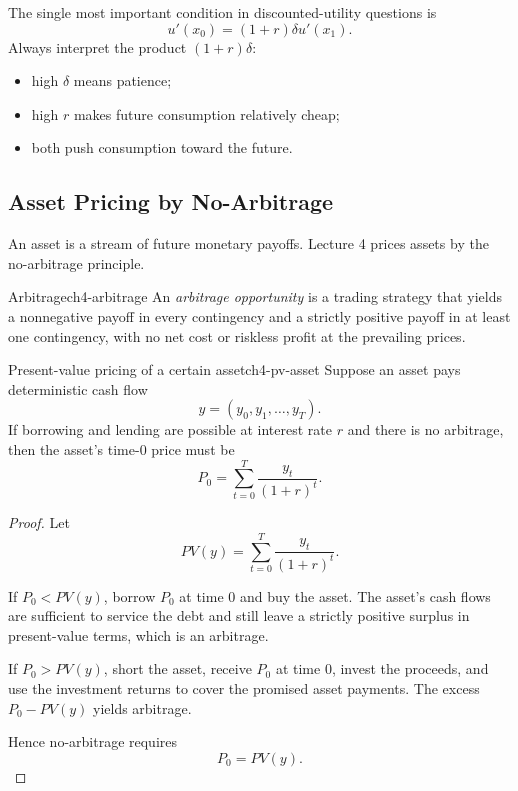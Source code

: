 \begin{examtip}
The single most important condition in discounted-utility questions is
\[
u'(x_0)=(1+r)\delta u'(x_1).
\]
Always interpret the product $(1+r)\delta$:
\begin{itemize}
    \item high $\delta$ means patience;
    \item high $r$ makes future consumption relatively cheap;
    \item both push consumption toward the future.
\end{itemize}
\end{examtip}

\subsection{Asset Pricing by No-Arbitrage}

An asset is a stream of future monetary payoffs. Lecture 4 prices assets by the no-arbitrage principle.

\begin{definition}{Arbitrage}{ch4-arbitrage}
An \emph{arbitrage opportunity} is a trading strategy that yields a nonnegative payoff in every contingency and a strictly positive payoff in at least one contingency, with no net cost or riskless profit at the prevailing prices.
\end{definition}

\begin{theorem}{Present-value pricing of a certain asset}{ch4-pv-asset}
Suppose an asset pays deterministic cash flow
\[
y=(y_0,y_1,\dots,y_T).
\]
If borrowing and lending are possible at interest rate $r$ and there is no arbitrage, then the asset's time-0 price must be
\[
P_0 = \sum_{t=0}^{T}\frac{y_t}{(1+r)^t}.
\]
\end{theorem}

\begin{proof}
Let
\[
PV(y)=\sum_{t=0}^{T}\frac{y_t}{(1+r)^t}.
\]

If $P_0<PV(y)$, borrow $P_0$ at time 0 and buy the asset. The asset's cash flows are sufficient to service the debt and still leave a strictly positive surplus in present-value terms, which is an arbitrage.

If $P_0>PV(y)$, short the asset, receive $P_0$ at time 0, invest the proceeds, and use the investment returns to cover the promised asset payments. The excess $P_0-PV(y)$ yields arbitrage.

Hence no-arbitrage requires
\[
P_0=PV(y).
\]
\end{proof}

